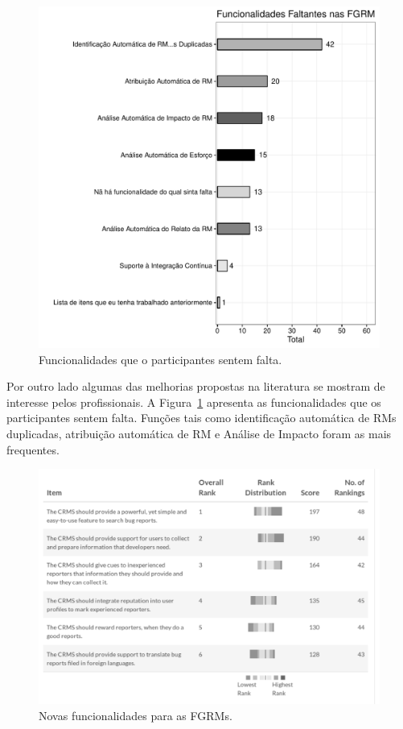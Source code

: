 \begin{figure}[htpb]
	\centering
	\includegraphics[width=0.8\linewidth]{./chapter-pesquisa-com-profissionais/img/grafico_melhorias_fgrm_funcionalidades_faltantes.pdf}
	\caption{Funcionalidades que o participantes sentem falta.}
\label{fig:grafico_melhorias_fgrm_funcionalidades_falantes}
\end{figure}

Por outro lado algumas das melhorias propostas na literatura se mostram de
interesse pelos profissionais. A
Figura~\ref{fig:grafico_melhorias_fgrm_funcionalidades_falantes} apresenta as
funcionalidades que os participantes sentem falta. Funções tais como
identificação automática de RMs duplicadas, atribuição automática de RM e
Análise de Impacto foram as mais frequentes. 

\begin{figure}[htpb]
	\centering
	\includegraphics[width=0.8\linewidth]{./chapter-pesquisa-com-profissionais/img/grafico_melhorias_fgrm_melhorias.pdf}
	\caption{Novas funcionalidades para as FGRMs.}
\label{fig:ggrafico_melhorias_fgrm_melhorias}
\end{figure}


